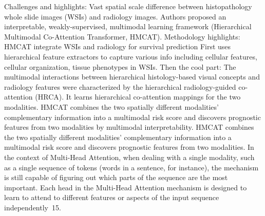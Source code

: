 \documentclass{article}%
\begin{document}
%
Challenges and highlights: %
\newline%
\newline%
%
Vast spatial scale difference between histopathology whole slide images (WSIs) and radiology images.%
\newline%
\newline%
%
Authors proposed an interpretable, weakly{-}supervised, multimodal learning framework (Hierarchical Multimodal Co{-}Attention Transformer, HMCAT). %
\newline%
\newline%
%
Methodology highlights: %
\newline%
\newline%
%
HMCAT integrate WSIs and radiology for survival prediction %
\newline%
\newline%
%
First uses hierarchical feature extractors to capture various info including cellular features, cellular organization, tissue phenotypes in WSIs.%
\newline%
\newline%
%
Then the cool part: %
\newline%
\newline%
%
The multimodal interactions between hierarchical histology{-}based visual concepts and radiology features were characterized by the hierarchical radiology{-}guided co{-}attention (HRCA). It learns hierarchical co{-}attention mappings for the two modalities. %
\newline%
\newline%
%
HMCAT combines the two spatially different modalities’ complementary information into a multimodal risk score and discovers prognostic features from two modalities by multimodal interpretability. %
\newline%
\newline%
%
HMCAT combines the two spatially different modalities’ complementary information into a multimodal risk score and discovers prognostic features from two modalities.%
\newline%
\newline%
%
In the context of Multi{-}Head Attention, when dealing with a single modality, such as a single sequence of tokens (words in a sentence, for instance), the mechanism is still capable of figuring out which parts of the sequence are the most important. Each head in the Multi{-}Head Attention mechanism is designed to learn to attend to different features or aspects of the input sequence independently~15.%
\newline%
\end{document}

